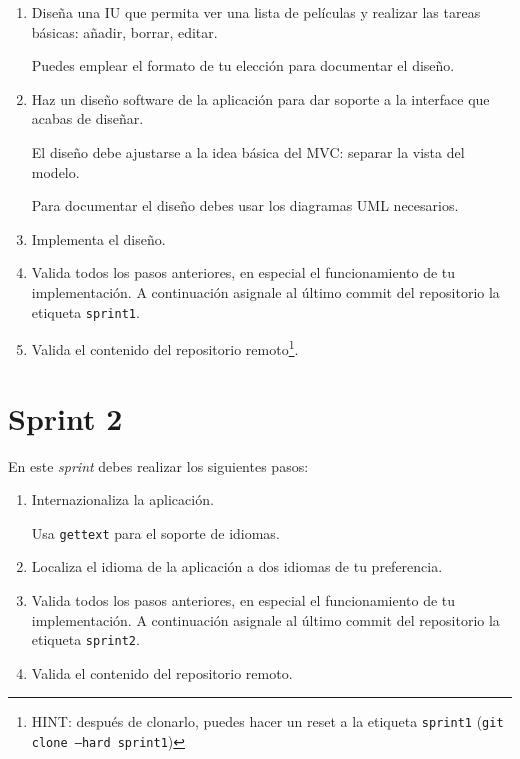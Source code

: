 \documentclass[11pt,a4paper]{article}
\begin{document}
\begin{enumerate}
\item Diseña una IU que permita ver una lista de películas y realizar
las tareas básicas: añadir, borrar, editar.

  Puedes emplear el formato de tu elección para documentar el diseño.

\item Haz un diseño software de la aplicación para dar soporte a la
  interface que acabas de diseñar.

  El diseño debe ajustarse a la idea básica del MVC: separar la vista
  del modelo.

  Para documentar el diseño debes usar los diagramas UML necesarios.

\item Implementa el diseño.

\item Valida todos los pasos anteriores, en especial el funcionamiento
  de tu implementación. A continuación asignale al último commit del
  repositorio la etiqueta \texttt{sprint1}.

\item Valida el contenido del repositorio remoto\footnote{HINT:
    después de clonarlo, puedes hacer un reset a la etiqueta
    \texttt{sprint1} (\texttt{git clone --hard sprint1})}.
\end{enumerate}



\section{Sprint 2}

En este \emph{sprint} debes realizar los siguientes pasos:

\begin{enumerate}
\item Internazionaliza la aplicación.

  Usa \texttt{gettext} para el soporte de idiomas.

\item Localiza el idioma de la aplicación a dos idiomas de tu
  preferencia.

\item Valida todos los pasos anteriores, en especial el funcionamiento
  de tu implementación. A continuación asignale al último commit del
  repositorio la etiqueta \texttt{sprint2}.

\item Valida el contenido del repositorio remoto.
\end{enumerate}
\end{document}
